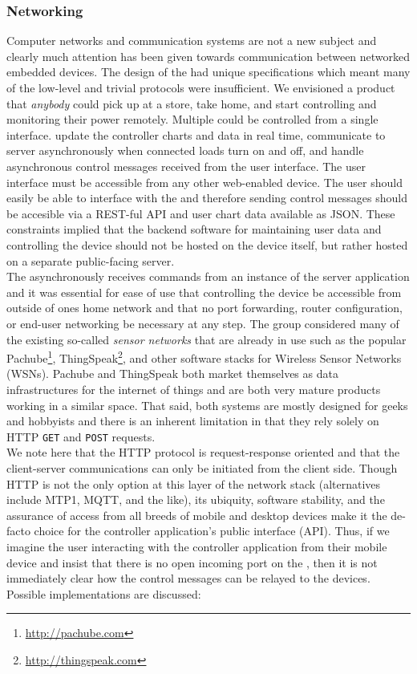 \subsubsection{Networking}
Computer networks and communication systems are not a new subject and clearly much attention has been given towards communication between networked embedded devices.  The design of the \netlet had unique specifications which meant many of the low-level and trivial protocols were insufficient.  We envisioned a product that \emph{anybody} could pick up at a store, take home, and start controlling and monitoring their power remotely.   Multiple \netlets could be controlled from a single interface.  \netlets update the controller charts and data in real time, communicate to server asynchronously when connected loads turn on and off, and handle asynchronous control messages received from the user interface.  The user interface must be accessible from any other web-enabled device. The user should easily be able to interface with the \netlet and therefore sending control messages should be accesible via a REST-ful API and user chart data available as JSON.  These constraints implied that the backend software for maintaining user data and controlling the device should not be hosted on the device itself, but rather hosted on a separate public-facing server.\\

The \netlet asynchronously receives commands from an instance of the server application and it was essential for ease of use that controlling the device be accessible from outside of ones home network and that no port forwarding, router configuration, or end-user networking be necessary at any step. The group considered many of the existing so-called \emph{sensor networks} that are already in use such as the popular Pachube\footnote{\url{http://pachube.com}}, ThingSpeak\footnote{\url{http://thingspeak.com}}, and other software stacks for Wireless Sensor Networks (WSNs).  Pachube and ThingSpeak both market themselves as data infrastructures for the internet of things and are both very mature products working in a similar space.  That said, both systems are mostly designed for geeks and hobbyists and there is an inherent limitation in that they rely solely on HTTP \texttt{GET} and \texttt{POST} requests.\\

We note here that the HTTP protocol is request-response oriented and that the client-server communications can only be initiated from the client side.  Though HTTP is not the only option at this layer of the network stack (alternatives include MTP1, MQTT, and the like), its ubiquity,  software stability, and the assurance of access from all breeds of mobile and desktop devices make it the de-facto choice for the controller application's public interface (API).   Thus, if we imagine the user interacting with the controller application from their mobile device and insist that there is no open incoming port on the \netlet, then  it is not immediately clear how the control messages can be relayed to the \netlet devices.  Possible implementations are discussed:

